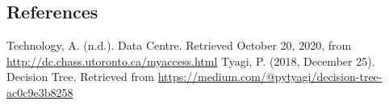 \documentclass[
]{article}
\begin{document}
\hypertarget{references}{%
\subsection{References}\label{references}}

Technology, A. (n.d.). Data Centre. Retrieved October 20, 2020, from
\url{http://dc.chass.utoronto.ca/myaccess.html} Tyagi, P. (2018,
December 25). Decision Tree. Retrieved from
\url{https://medium.com/@pytyagi/decision-tree-ac0c9e3b8258}
\end{document}
